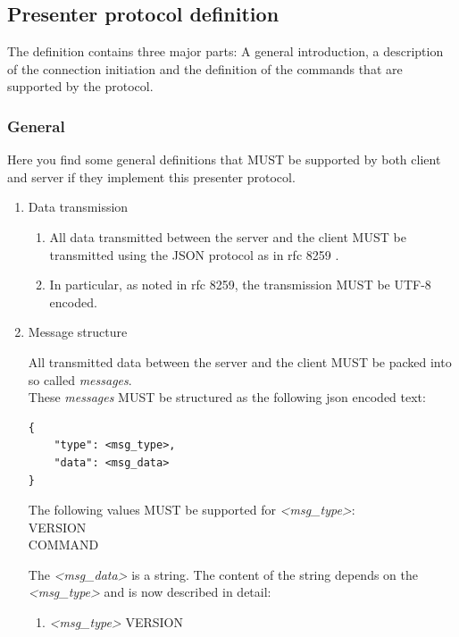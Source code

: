 \documentclass[]{article}
\begin{document}
\subsection{Presenter protocol definition}

The definition contains three major parts: A general introduction, a description of the connection initiation and the definition of the commands that are supported by the protocol.

\subsubsection{General}

Here you find some general definitions that MUST be supported by both client and server if they implement this presenter protocol.

\begin{enumerate}
    \item Data transmission

        \begin{enumerate}
           \item All data transmitted between the server and the client MUST be transmitted using the JSON protocol as in rfc 8259 \cite{JSON}.
           \item In particular, as noted in rfc 8259, the transmission MUST be UTF-8 encoded.
        \end{enumerate}
    \item Message structure

        All transmitted data between the server and the client MUST be packed into so called \emph{messages}.\\
        These \emph{messages} MUST be structured as the following json encoded text:
\begin{verbatim}
{
    "type": <msg_type>,
    "data": <msg_data>
}
\end{verbatim}

        The following values MUST be supported for \emph{\textless{}msg\_type\textgreater{}}:\\
        VERSION\\
        COMMAND

        The \emph{\textless{}msg\_data\textgreater{}} is a string. The content of the string depends on the \emph{\textless{}msg\_type\textgreater{}} and is now described in detail:

\newpage

        \begin{enumerate}
            \item \emph{\textless{}msg\_type\textgreater{}} VERSION
                \label{msg_version}


\end{enumerate}
\end{enumerate}
\end{document}
